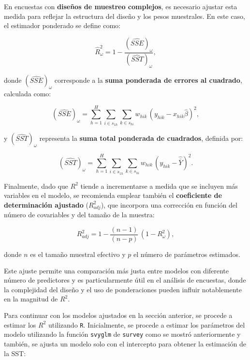 \documentclass[
  12pt,
]{book}
\begin{document}
En encuestas con \textbf{diseños de muestreo complejos}, es necesario ajustar esta medida para reflejar la estructura del diseño y los pesos muestrales. En este caso, el estimador ponderado se define como:

\[
\hat{R}_\omega^2 = 1 - \frac{(\widehat{SSE})_\omega}{(\widehat{SST})_\omega},
\]

donde \((\widehat{SSE})_\omega\) corresponde a la \textbf{suma ponderada de errores al cuadrado}, calculada como:

\[
(\widehat{SSE})_\omega = \sum_{h=1}^{H} \sum_{i \in s_{1h}} \sum_{k \in s_{hi}} w_{hik} \,(y_{hik} - x_{hik}\hat{\beta})^2,
\]

y \((\widehat{SST})_\omega\) representa la \textbf{suma total ponderada de cuadrados}, definida por:

\[
(\widehat{SST})_\omega = \sum_{h=1}^{H} \sum_{i \in s_{1h}} \sum_{k \in s_{hi}} w_{hik}\,(y_{hik} - \hat{\bar{Y}})^2.
\]

Finalmente, dado que \(R^{2}\) tiende a incrementarse a medida que se incluyen más variables en el modelo, se recomienda emplear también el \textbf{coeficiente de determinación ajustado} (\(R_{adj}^{2}\)), que incorpora una corrección en función del número de covariables y del tamaño de la muestra:

\[
R_{adj}^{2} = 1 - \frac{(n-1)}{(n-p)} \,(1 - R_{\omega}^{2}),
\]

donde \(n\) es el tamaño muestral efectivo y \(p\) el número de parámetros estimados.

Este ajuste permite una comparación más justa entre modelos con diferente número de predictores y es particularmente útil en el análisis de encuestas, donde la complejidad del diseño y el uso de ponderaciones pueden influir notablemente en la magnitud de \(R^{2}\).

Para continuar con los modelos ajustados en la sección anterior, se procede a estimar los \(R^{2}\) utilizando \texttt{R}. Inicialmente, se procede a estimar los parámetros del modelo utilizando la función \texttt{svyglm} de \texttt{survey} como se mostró anteriormente y también, se ajusta un modelo solo con el intercepto para obtener la estimación de la SST:
\end{document}
